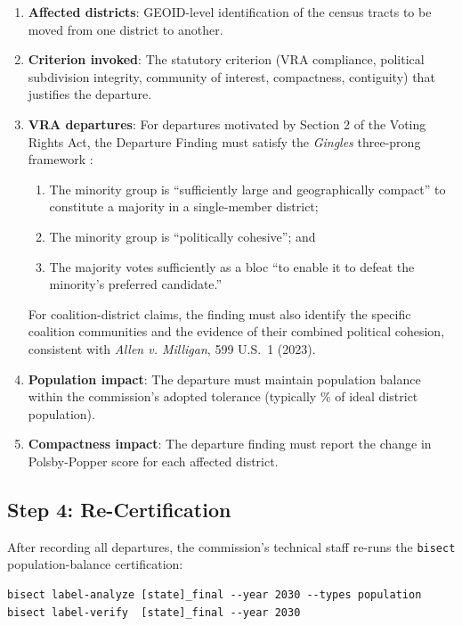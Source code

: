 \begin{enumerate}
  \item \textbf{Affected districts}: GEOID-level identification of the census tracts to be moved from one district to another.
  \item \textbf{Criterion invoked}: The statutory criterion (VRA compliance, political subdivision integrity, community of interest, compactness, contiguity) that justifies the departure.
  \item \textbf{VRA departures}: For departures motivated by Section 2 of the Voting Rights Act, the Departure Finding must satisfy the \textit{Gingles} three-prong framework \citep{gingles1986}:
    \begin{enumerate}[label=(\roman*)]
      \item The minority group is ``sufficiently large and geographically compact'' to constitute a majority in a single-member district;
      \item The minority group is ``politically cohesive''; and
      \item The majority votes sufficiently as a bloc ``to enable it to defeat the minority's preferred candidate.''
    \end{enumerate}
    For coalition-district claims, the finding must also identify the specific coalition communities and the evidence of their combined political cohesion, consistent with \textit{Allen v. Milligan}, 599 U.S.\ 1 (2023).
  \item \textbf{Population impact}: The departure must maintain population balance within the commission's adopted tolerance (typically \% of ideal district population).
  \item \textbf{Compactness impact}: The departure finding must report the change in Polsby-Popper score for each affected district.
\end{enumerate}

\subsection{Step 4: Re-Certification}

After recording all departures, the commission's technical staff re-runs the \texttt{bisect} population-balance certification:
\begin{verbatim}
bisect label-analyze [state]_final --year 2030 --types population
bisect label-verify  [state]_final --year 2030
\end{verbatim}

